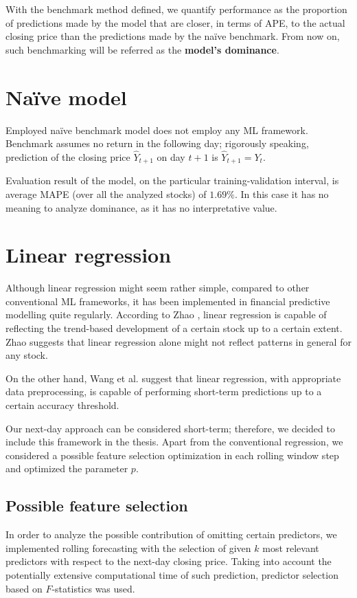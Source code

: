 With the benchmark method defined, we quantify performance as the proportion of predictions made by the model that are closer, in terms of APE, to the actual 
closing price than the predictions made by the naïve benchmark. From now on, such benchmarking will be referred as the \textbf{model's dominance}.

\section{Naïve model}
\label{naive}
Employed naïve benchmark model does not employ any ML framework. Benchmark assumes no return in the following day; rigorously speaking, prediction of the closing price $\hat{Y}_{t+1}$ on day $t + 1$ is $\hat{Y}_{t+1} = Y_{t}$.

Evaluation result of the model, on the particular training-validation interval, is average MAPE (over all the analyzed stocks) of $\mathbf{1.69 \%}$. In this case it has no meaning to analyze dominance, as it has no interpretative value.

\section{Linear regression}
Although linear regression might seem rather simple, compared to other conventional ML frameworks, it has been implemented in financial predictive
modelling quite regularly. According to Zhao \cite{zhao}, linear regression is capable of reflecting the trend-based development of a certain stock up to a certain extent. 
Zhao suggests that linear regression alone might not reflect patterns in general for any stock.

On the other hand, Wang et al. \cite{wang} suggest that linear regression, with appropriate data preprocessing, is capable of performing short-term predictions up to a certain
accuracy threshold.

Our next-day approach can be considered short-term; therefore, we decided to include this framework in the thesis. Apart from the conventional regression, we considered 
a possible feature selection optimization in each rolling window step and optimized the parameter $p$.

\subsection{Possible feature selection}
In order to analyze the possible contribution of omitting certain predictors, we implemented rolling forecasting with the selection of given $k$ most relevant predictors
with respect to the next-day closing price. Taking into account the potentially extensive computational time of such prediction, predictor selection based on $F$-statistics
was used. 

